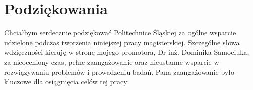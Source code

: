 \chapter{Podziękowania}
Chciałbym serdecznie podziękować Politechnice Śląskiej za ogólne wsparcie udzielone podczas tworzenia niniejszej pracy magisterskiej. Szczególne słowa wdzięczności kieruję w stronę mojego promotora, Dr inż. Dominika Samociuka, za nieoceniony czas, pełne zaangażowanie oraz nieustanne wsparcie w rozwiązywaniu problemów i prowadzeniu badań. Pana zaangażowanie było kluczowe dla osiągnięcia celów tej pracy.